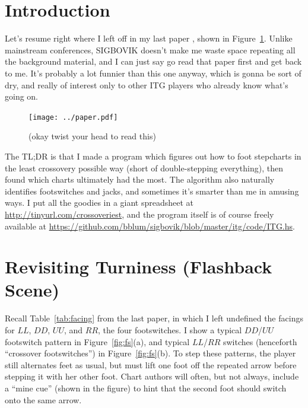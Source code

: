 \documentclass[10pt]{sigplanconf}
\begin{document}
\section{Introduction}

Let's resume right where I left off in my last paper \cite{turniness}, shown in Figure~\ref{fig:you-stutid-fuckass}.
Unlike mainstream conferences, SIGBOVIK doesn't make me waste space repeating all the background material,
and I can just say go read that paper first and get back to me.
It's probably a lot funnier than this one anyway, which is gonna be sort of dry,
and really of interest only to other ITG players who already know what's going on.

\begin{figure}[h]
	\hspace{-2em}\texttt{[image: ../paper.pdf]}
	\caption{(okay twist your head to read this)}
	\label{fig:you-stutid-fuckass}
\end{figure}

The TL;DR is that I made a program which figures out how to foot stepcharts in the least crossovery possible way (short of double-stepping everything),
then found which charts ultimately had the most.
The algorithm also naturally identifies footswitches and jacks, %
and sometimes it's smarter than me in amusing ways.
I put all the goodies in a giant spreadsheet at \url{http://tinyurl.com/crossoveriest},
and the program itself is of course freely available at \url{https://github.com/bblum/sigbovik/blob/master/itg/code/ITG.hs}.




\section{Revisiting Turniness (Flashback Scene)}

Recall Table~\ref{tab:facing} from the last paper, in which I left undefined the facings for $LL$, $DD$, $UU$, and $RR$, the four footswitches.
I show a typical $DD$/$UU$ footswitch pattern in Figure~\ref{fig:fs}(a), and typical $LL$/$RR$ switches (henceforth ``crossover footswitches'') in Figure~\ref{fig:fs}(b).
To step these patterns, the player still alternates feet as usual, but must lift one foot off the repeated arrow before stepping it with her other foot.
Chart authors will often, but not always, include a ``mine cue'' (shown in the figure) to hint that the second foot should switch onto the same arrow.
\end{document}
